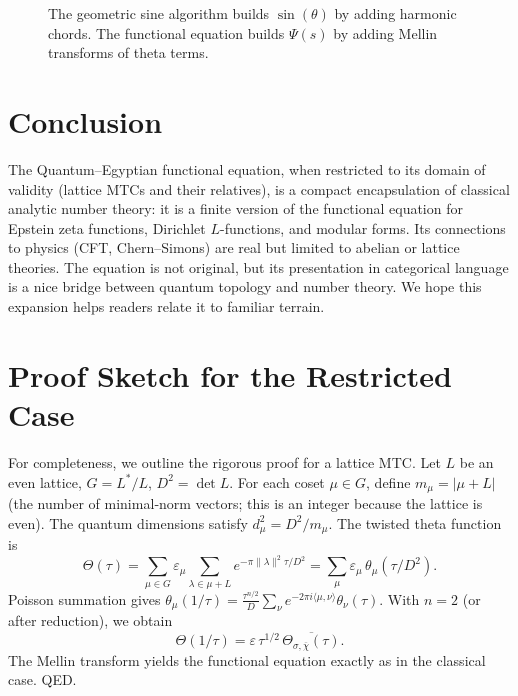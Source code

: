 \documentclass[12pt,a4paper]{article}
\theoremstyle{remark}
\begin{document}
\begin{figure}[h]
\centering
{}
\caption{The geometric sine algorithm builds $\sin(\theta)$ by adding harmonic chords. The functional equation builds $\Psi(s)$ by adding Mellin transforms of theta terms.}
\end{figure}

\section{Conclusion}

The Quantum–Egyptian functional equation, when restricted to its domain of validity (lattice MTCs and their relatives), is a compact encapsulation of classical analytic number theory: it is a finite version of the functional equation for Epstein zeta functions, Dirichlet $L$-functions, and modular forms. Its connections to physics (CFT, Chern–Simons) are real but limited to abelian or lattice theories. The equation is not original, but its presentation in categorical language is a nice bridge between quantum topology and number theory. We hope this expansion helps readers relate it to familiar terrain.

\appendix

\section{Proof Sketch for the Restricted Case}

For completeness, we outline the rigorous proof for a lattice MTC. Let $L$ be an even lattice, $G=L^*/L$, $D^2=\det L$. For each coset $\mu\in G$, define $m_\mu = |\mu+L|$ (the number of minimal‑norm vectors; this is an integer because the lattice is even). The quantum dimensions satisfy $d_\mu^2 = D^2/m_\mu$. The twisted theta function is
\[
\Theta(\tau)=\sum_{\mu\in G}\varepsilon_\mu\sum_{\lambda\in \mu+L}e^{-\pi\|\lambda\|^2\tau/D^2}
= \sum_{\mu}\varepsilon_\mu\,\theta_\mu(\tau/D^2).
\]
Poisson summation gives $\theta_\mu(1/\tau)=\frac{\tau^{n/2}}{D}\sum_{\nu}e^{-2\pi i\langle\mu,\nu\rangle}\theta_\nu(\tau)$. With $n=2$ (or after reduction), we obtain
\[
\Theta(1/\tau)=\varepsilon\,\tau^{1/2}\,\overline{\Theta_{\sigma,\overline{\chi}}(\tau)}.
\]
The Mellin transform yields the functional equation exactly as in the classical case. QED.
\end{document}
